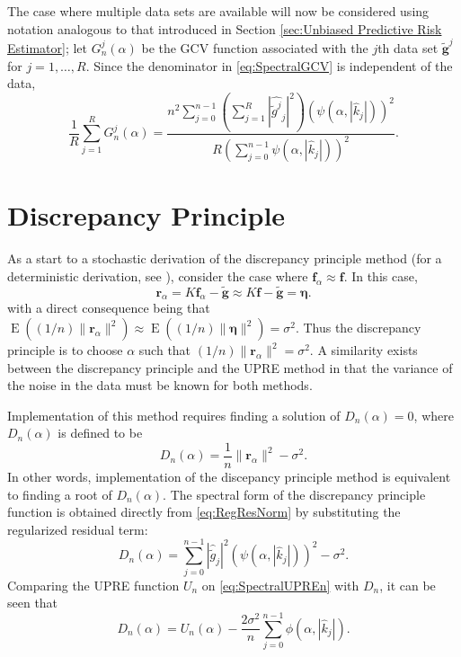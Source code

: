 \documentclass[12pt,notitlepage]{report}
\newcommand{\gnoise}{\widetilde{g}}	%
\newcommand{\gnoiseVec}{\widetilde{\mathbf{g}}}	%
\newcommand{\kMat}{K}	%
\newcommand{\fVec}{\mathbf{f}}	%
\newcommand{\regparam}{\alpha}
\newcommand{\regf}{\fVec_{\regparam}}	%
\newcommand{\filt}{\phi}
\newcommand{\mfilt}{\psi}
\newcommand{\noise}{\eta}	%
\newcommand{\noiseSD}{\sigma}	%
\newcommand{\noiseVec}{\bm{\noise}}	%
\DeclareMathOperator{\E}{E}	%
\newcommand{\regres}{\mathbf{r}_{\regparam}}	%
\newcommand{\U}{U}	%
\newcommand{\GCV}{G}	%
\newcommand{\D}{D}	%
\begin{document}
The case where multiple data sets are available will now be considered using notation analogous to that introduced in Section \ref{sec:Unbiased Predictive Risk Estimator}; let $\GCV_n^j(\regparam)$ be the GCV function associated with the $j$th data set $\gnoiseVec^j$ for $j = 1,\ldots,R$. Since the denominator in \eqref{eq:SpectralGCV} is independent of the data,
\begin{equation}
\frac{1}{R}\sum_{j=1}^R \GCV_n^j(\regparam)  = \frac{n^2\sum_{j = 0}^{n-1} \left(\sum_{j=1}^R |\widehat{\gnoise^j}_j|^2\right)(\mfilt(\regparam,|\widehat{k}_j|))^2}{R(\sum_{j = 0}^{n-1} \mfilt(\regparam,|\widehat{k}_j|))^2}.
\label{eq:SpectralGCVsum}
\end{equation}

\section{Discrepancy Principle} \label{sec:Discrepancy Principle}
As a start to a stochastic derivation of the discrepancy principle method (for a deterministic derivation, see \cite{Vogel:2002}), consider the case where $\regf \approx \fVec$. In this case,
\[\regres = \kMat\regf - \gnoiseVec \approx \kMat\fVec - \gnoiseVec = \noiseVec.\]
with a direct consequence being that $\E((1/n)\|\regres\|^2) \approx \E((1/n)\|\noiseVec\|^2) =\noiseSD^2$. Thus the discrepancy principle is to choose $\regparam$ such that $(1/n)\|\regres\|^2 = \noiseSD^2$. A similarity exists between the discrepancy principle and the UPRE method in that the variance of the noise in the data must be known for both methods. \par 
Implementation of this method requires finding a solution of $\D_n(\regparam) = 0$, where $\D_n(\regparam)$ is defined to be
\begin{equation}
\label{eq:DP}
\D_n(\regparam) = \frac{1}{n}\|\regres\|^2 - \noiseSD^2.
\end{equation}
In other words, implementation of the discepancy principle method is equivalent to finding a root of $\D_n(\regparam)$. The spectral form of the discrepancy principle function is obtained directly from \eqref{eq:RegResNorm} by substituting the regularized residual term:
\begin{equation}
\D_n(\regparam) = \sum_{j = 0}^{n-1} |\widehat{\gnoise}_j|^2(\mfilt(\regparam,|\widehat{k}_j|))^2 - \noiseSD^2.
\label{eq:SpectralDP}
\end{equation}
Comparing the UPRE function $\U_n$ on \eqref{eq:SpectralUPREn} with $\D_n$, it can be seen that
\begin{equation}
\label{eq:UPRE DP Comp}
\D_n(\regparam) = \U_n(\regparam) - \frac{2\noiseSD^2}{n}\sum_{j = 0}^{n-1} \filt(\regparam,|\widehat{k}_j|).
\end{equation}
\end{document}
